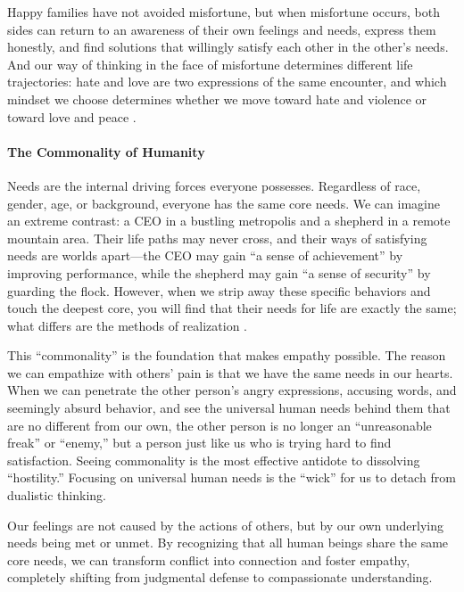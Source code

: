 Happy families have not avoided misfortune, but when misfortune occurs,
both sides can return to an awareness of their own feelings and needs,
express them honestly, and find solutions that willingly satisfy each other
in the other's needs.
And our way of thinking in the face of misfortune determines different life
trajectories: hate and love are two expressions of the same encounter, and
which mindset we choose determines whether we move toward hate and violence
or toward love and peace \citep{gottman1997}.

\paragraph{The Commonality of Humanity}
Needs are the internal driving forces everyone possesses.
Regardless of race, gender, age, or background, everyone has the same core
needs.
We can imagine an extreme contrast: a CEO in a bustling metropolis and a
shepherd in a remote mountain area.
Their life paths may never cross, and their ways of satisfying needs are
worlds apart---the CEO may gain ``a sense of achievement'' by improving
performance, while the shepherd may gain ``a sense of security'' by
guarding the flock.
However, when we strip away these specific behaviors and touch the deepest
core, you will find that their needs for life are exactly the same; what
differs are the methods of realization \citep{ekman1992}.

This ``commonality'' is the foundation that makes empathy possible.
The reason we can empathize with others' pain is that we have the same
needs in our hearts.
When we can penetrate the other person's angry expressions, accusing words,
and seemingly absurd behavior, and see the universal human needs behind
them that are no different from our own, the other person is no longer an
``unreasonable freak'' or ``enemy,'' but a person just like us who is
trying hard to find satisfaction.
Seeing commonality is the most effective antidote to dissolving ``hostility.''
Focusing on universal human needs is the ``wick'' for us to detach from
dualistic thinking.

\begin{keyinsight}
Our feelings are not caused by the actions of others, but by our own
underlying needs being met or unmet.
By recognizing that all human beings share the same core needs, we can
transform conflict into connection and foster empathy, completely shifting
from judgmental defense to compassionate understanding.
\end{keyinsight}
